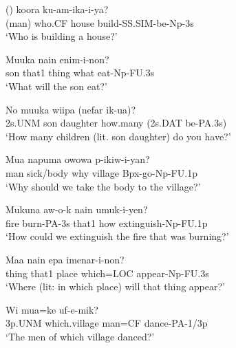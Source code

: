\ea%
\label{ex:x1167}
\gll ()    koora  ku-am-ika-i-ya? \\
  (man)  who.CF  house  build-SS.SIM-be-Np-3s    \\
\glt `Who is building a house?'
\z





\ea%
\label{ex:x1166}
\gll Muuka  nain      enim-i-non? \\
son  that1  thing  what  eat-Np-FU.3s  \\
\glt `What will the son eat?'
\z





\ea%
\label{ex:x1164}
\gll No  muuka  wiipa    (nefar  ik-ua)? \\
2s.UNM  son  daughter  how.many  (2s.DAT  be-PA.3s)\\
\glt `How many children (lit. son daughter) do you have?'
\z





\ea%
\label{ex:x1165}
\gll Mua  napuma    owowa  p-ikiw-i-yan? \\
man  sick/body  why  village  Bpx-go-Np-FU.1p  \\
\glt `Why should we take the body to the village?'
\z





\ea%
\label{ex:x1378}
\gll Mukuna  aw-o-k  nain    umuk-i-yen? \\
fire  burn-PA-3s  that1  how  extinguish-Np-FU.1p      \\
\glt `How could we extinguish the fire that was burning?'
\z





\ea%
\label{ex:x1173}
\gll Maa  nain  epa    imenar-i-non? \\
thing  that1  place  which=LOC  appear-Np-FU.3s      \\
\glt `Where (lit: in which place) will that thing appear?'
\z





\ea%
\label{ex:x1174}
\gll Wi   mua=ke  uf-e-mik? \\
3p.UNM  which.village  man=CF  dance-PA-1/3p      \\
\glt `The men of which village danced?'
\z





